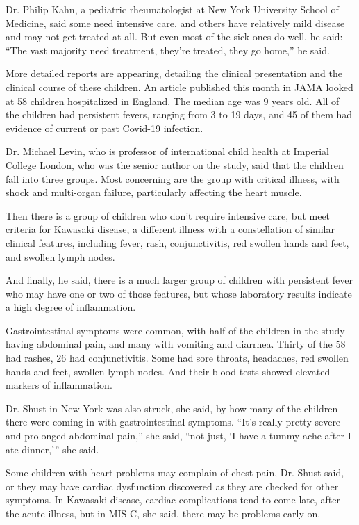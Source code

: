Dr. Philip Kahn, a pediatric rheumatologist at New York University
School of Medicine, said some need intensive care, and others have
relatively mild disease and may not get treated at all. But even most of
the sick ones do well, he said: ``The vast majority need treatment,
they're treated, they go home,'' he said.

More detailed reports are appearing, detailing the clinical presentation
and the clinical course of these children. An
\href{https://jamanetwork.com/journals/jama/fullarticle/2767209}{article}
published this month in JAMA looked at 58 children hospitalized in
England. The median age was 9 years old. All of the children had
persistent fevers, ranging from 3 to 19 days, and 45 of them had
evidence of current or past Covid-19 infection.

Dr. Michael Levin, who is professor of international child health at
Imperial College London, who was the senior author on the study, said
that the children fall into three groups. Most concerning are the group
with critical illness, with shock and multi-organ failure, particularly
affecting the heart muscle.

Then there is a group of children who don't require intensive care, but
meet criteria for Kawasaki disease, a different illness with a
constellation of similar clinical features, including fever, rash,
conjunctivitis, red swollen hands and feet, and swollen lymph nodes.

And finally, he said, there is a much larger group of children with
persistent fever who may have one or two of those features, but whose
laboratory results indicate a high degree of inflammation.

Gastrointestinal symptoms were common, with half of the children in the
study having abdominal pain, and many with vomiting and diarrhea. Thirty
of the 58 had rashes, 26 had conjunctivitis. Some had sore throats,
headaches, red swollen hands and feet, swollen lymph nodes. And their
blood tests showed elevated markers of inflammation.

Dr. Shust in New York was also struck, she said, by how many of the
children there were coming in with gastrointestinal symptoms. ``It's
really pretty severe and prolonged abdominal pain,'' she said, ``not
just, `I have a tummy ache after I ate dinner,''' she said.

Some children with heart problems may complain of chest pain, Dr. Shust
said, or they may have cardiac dysfunction discovered as they are
checked for other symptoms. In Kawasaki disease, cardiac complications
tend to come late, after the acute illness, but in MIS-C, she said,
there may be problems early on.

